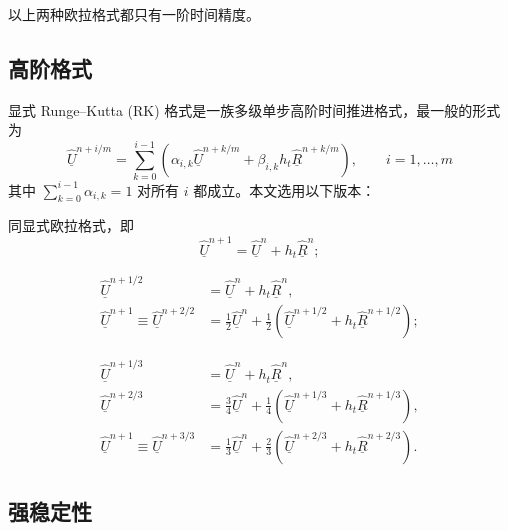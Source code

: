 以上两种欧拉格式都只有一阶时间精度。

\subsection{高阶格式}

显式 Runge–Kutta (RK) 格式是一族多级单步高阶时间推进格式，最一般的形式为
\begin{equation}
\underline{\hat{U}}^{n+i/m}=\sum_{k=0}^{i-1}\left(\alpha_{i,k}\underline{\hat{U}}^{n+k/m}+\beta_{i,k}h_{t}\underline{\hat{R}}^{n+k/m}\right),\qquad i=1,\dots,m\label{eq:RKm}
\end{equation}
其中 $\sum_{k=0}^{i-1}\alpha_{i,k}=1$ 对所有 $i$ 都成立。本文选用以下版本：
\begin{description}[wide]
\item [{一阶}] 同显式欧拉格式，即
\begin{equation}
\underline{\hat{U}}^{n+1}=\underline{\hat{U}}^{n}+h_{t}\underline{\hat{R}}^{n};\label{eq:RK1}
\end{equation}
\item [{二阶}] 
\begin{equation}
\begin{aligned}\underline{\hat{U}}^{n+1/2} & =\underline{\hat{U}}^{n}+h_{t}\underline{\hat{R}}^{n},\\
\underline{\hat{U}}^{n+1}\equiv\underline{\hat{U}}^{n+2/2} & =\frac{1}{2}\underline{\hat{U}}^{n}+\frac{1}{2}\left(\underline{\hat{U}}^{n+1/2}+h_{t}\underline{\hat{R}}^{n+1/2}\right);
\end{aligned}
\label{eq:RK2}
\end{equation}
\item [{三阶}] 
\begin{equation}
\begin{aligned}\underline{\hat{U}}^{n+1/3} & =\underline{\hat{U}}^{n}+h_{t}\underline{\hat{R}}^{n},\\
\underline{\hat{U}}^{n+2/3} & =\frac{3}{4}\underline{\hat{U}}^{n}+\frac{1}{4}\left(\underline{\hat{U}}^{n+1/3}+h_{t}\underline{\hat{R}}^{n+1/3}\right),\\
\underline{\hat{U}}^{n+1}\equiv\underline{\hat{U}}^{n+3/3} & =\frac{1}{3}\underline{\hat{U}}^{n}+\frac{2}{3}\left(\underline{\hat{U}}^{n+2/3}+h_{t}\underline{\hat{R}}^{n+2/3}\right).
\end{aligned}
\label{eq:RK3}
\end{equation}
\end{description}


\subsection{强稳定性}


